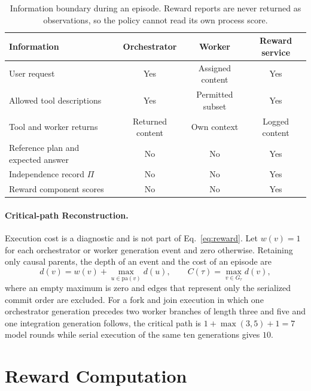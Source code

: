 \begin{table}[ht]
\centering\small
\caption{Information boundary during an episode. Reward reports are never returned as observations, so the policy cannot read its own process score.}
\label{tab:visibility}
\begin{tabularx}{\linewidth}{Yccc}
\toprule
Information & Orchestrator & Worker & Reward service \\
\midrule
User request & Yes & Assigned content & Yes \\
Allowed tool descriptions & Yes & Permitted subset & Yes \\
Tool and worker returns & Returned content & Own context & Logged content \\
Reference plan and expected answer & No & No & Yes \\
Independence record $\Pi$ & No & No & Yes \\
Reward component scores & No & No & Yes \\
\bottomrule
\end{tabularx}
\end{table}

\paragraph{Critical-path Reconstruction.}
Execution cost is a diagnostic and is not part of Eq.~\ref{eq:reward}.
Let $w(v)=1$ for each orchestrator or worker generation event and zero otherwise.
Retaining only causal parents, the depth of an event and the cost of an episode are
\begin{equation}
d(v)=w(v)+\max_{u\in\mathrm{pa}(v)}d(u),\qquad C(\tau)=\max_{v\in G_\tau}d(v),
\label{eq:critical-path}
\end{equation}
where an empty maximum is zero and edges that represent only the serialized commit order are excluded.
For a fork and join execution in which one orchestrator generation precedes two worker branches of length three and five and one integration generation follows, the critical path is $1+\max(3,5)+1=7$ model rounds while serial execution of the same ten generations gives $10$.

\section{Reward Computation}
\label{app:process}

